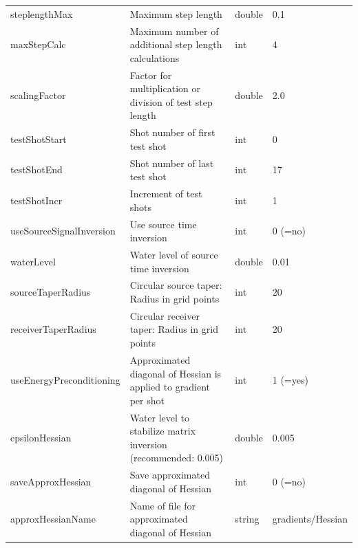 \documentclass[pdftex,a4paper,parskip,listof=totoc,bibliography=totoc,onehalfspacing,12pt]{scrreprt}
\begin{document}
\begin{table}[h!]
\begin{adjustbox}{width=1\textwidth,center=\textwidth}
\begin{tabular}{llll}
         steplengthMax            & Maximum step length                                                 & double & 0.1 \\                     
         maxStepCalc              & Maximum number of additional step length calculations               &  int   & 4 \\                         
         scalingFactor            & Factor for multiplication or division of test step length           & double & 2.0 \\                       
         testShotStart            & Shot number of first test shot                                      &  int   & 0 \\                        
         testShotEnd              & Shot number of last test shot                                       &  int   & 17 \\                        
         testShotIncr             & Increment of test shots                                             &  int   & 1 \\                       
        \midrule
         useSourceSignalInversion & Use source time inversion                                           &  int   & 0 (=no) \\
         waterLevel               & Water level of source time inversion                                & double & 0.01 \\                        
        \midrule
         sourceTaperRadius        & Circular source taper: Radius in grid points                        &  int   & 20 \\ 
         receiverTaperRadius      & Circular receiver taper: Radius in grid points                      &  int   & 20 \\
         useEnergyPreconditioning & Approximated diagonal of Hessian is applied to gradient per shot    &  int   & 1 (=yes) \\ 
         epsilonHessian           & Water level to stabilize matrix inversion (recommended: 0.005)      & double & 0.005 \\      
         saveApproxHessian        & Save approximated diagonal of Hessian                               &  int   & 0 (=no) \\
         approxHessianName        & Name of file for approximated diagonal of Hessian                   & string & gradients/Hessian \\
	\bottomrule
	\end{tabular}
	\end{adjustbox}
\end{table}	
\end{document}

